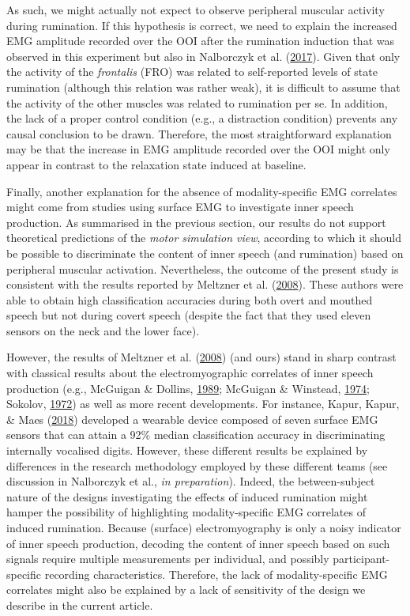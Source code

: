 \documentclass[a4paper,12pt,twoside,openright,oldfontcommands]{memoir}
\begin{document}
As such, we might actually not expect to observe peripheral muscular activity during rumination. If this hypothesis is correct, we need to explain the increased EMG amplitude recorded over the OOI after the rumination induction that was observed in this experiment but also in Nalborczyk et al. (\protect\hyperlink{ref-nalborczyk_orofacial_2017}{2017}). Given that only the activity of the \emph{frontalis} (FRO) was related to self-reported levels of state rumination (although this relation was rather weak), it is difficult to assume that the activity of the other muscles was related to rumination per se. In addition, the lack of a proper control condition (e.g., a distraction condition) prevents any causal conclusion to be drawn. Therefore, the most straightforward explanation may be that the increase in EMG amplitude recorded over the OOI might only appear in contrast to the relaxation state induced at baseline.

Finally, another explanation for the absence of modality-specific EMG correlates might come from studies using surface EMG to investigate inner speech production. As summarised in the previous section, our results do not support theoretical predictions of the \emph{motor simulation view}, according to which it should be possible to discriminate the content of inner speech (and rumination) based on peripheral muscular activation. Nevertheless, the outcome of the present study is consistent with the results reported by Meltzner et al. (\protect\hyperlink{ref-meltzner_speech_2008}{2008}). These authors were able to obtain high classification accuracies during both overt and mouthed speech but not during covert speech (despite the fact that they used eleven sensors on the neck and the lower face).

However, the results of Meltzner et al. (\protect\hyperlink{ref-meltzner_speech_2008}{2008}) (and ours) stand in sharp contrast with classical results about the electromyographic correlates of inner speech production (e.g., McGuigan \& Dollins, \protect\hyperlink{ref-mcguigan_patterns_1989}{1989}; McGuigan \& Winstead, \protect\hyperlink{ref-mcguigan_discriminative_1974}{1974}; Sokolov, \protect\hyperlink{ref-sokolov_inner_1972}{1972}) as well as more recent developments. For instance, Kapur, Kapur, \& Maes (\protect\hyperlink{ref-kapur_alterego:_2018}{2018}) developed a wearable device composed of seven surface EMG sensors that can attain a 92\% median classification accuracy in discriminating internally vocalised digits. However, these different results be explained by differences in the research methodology employed by these different teams (see discussion in Nalborczyk et al., \emph{in preparation}). Indeed, the between-subject nature of the designs investigating the effects of induced rumination might hamper the possibility of highlighting modality-specific EMG correlates of induced rumination. Because (surface) electromyography is only a noisy indicator of inner speech production, decoding the content of inner speech based on such signals require multiple measurements per individual, and possibly participant-specific recording characteristics. Therefore, the lack of modality-specific EMG correlates might also be explained by a lack of sensitivity of the design we describe in the current article.
\end{document}
